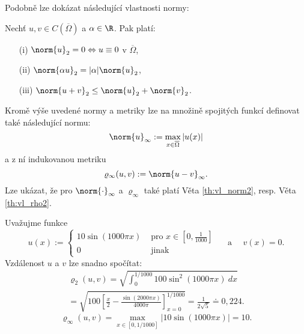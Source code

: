 Podobně lze dokázat následující vlastnosti normy:
\begin{veta}
\label{th:vl_norm2}
Nechť $u,v\in C(\overline\Omega)$ a $\alpha\in\R$. Pak platí:
\begin{itemize}
\item[(i)] $\norm{u}_2 = 0 \Leftrightarrow u\equiv 0$ v $\overline\Omega$,
\item[(ii)] $\norm{\alpha u}_2 = |\alpha|\norm{u}_2$,
\item[(iii)] $\norm{u+v}_2\le\norm{u}_2 + \norm{v}_2$.
\end{itemize}
\end{veta}


Kromě výše uvedené normy a metriky lze na množině spojitých funkcí definovat také následující normu:
\[ \norm{u}_\infty := \max_{x\in\overline\Omega}|u(x)| \]
a z ní indukovanou metriku
\[ \varrho_\infty(u,v) := \norm{u-v}_\infty. \]
Lze ukázat, že pro $\norm{\cdot}_\infty$ a $\varrho_\infty$ také platí Věta \ref{th:vl_norm2}, resp. Věta \ref{th:vl_rho2}.

\begin{ex}
Uvažujme funkce
\[ u(x):=\begin{cases}10\sin(1000\pi x) & \mbox{ pro }x\in[0,\frac1{1000}]\\0 & \mbox{ jinak}\end{cases} \quad\mbox{ a } \quad v(x)=0. \]
Vzdálenost $u$ a $v$ lze snadno spočítat:
\begin{multline*}
\varrho_2(u,v) = \sqrt{\int_0^{1/1000}100\sin^2(1000\pi x)~dx}\\
= \sqrt{100\left[\frac{x}2-\frac{\sin(2000\pi x)}{4000\pi}\right]_{x=0}^{1/1000}}
= \frac1{2\sqrt{5}}\doteq 0,224.
\end{multline*}
\[ \varrho_\infty(u,v) = \max_{x\in[0,1/1000]}|10\sin(1000\pi x)| = 10. \]
\end{ex}

